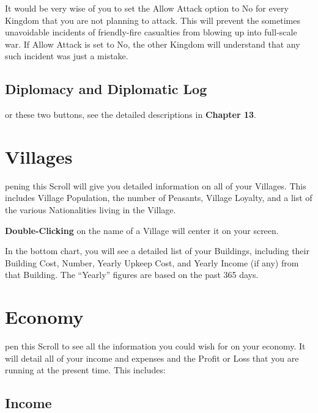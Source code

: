 
It would be very wise of you to set the Allow Attack option to No for every Kingdom that you are not planning to attack. This will prevent the sometimes unavoidable incidents of friendly-fire casualties from blowing up into full-scale war. If Allow Attack is set to No, the other Kingdom will understand that any such incident was just a mistake.

\subsection{Diplomacy and Diplomatic Log}

or these two buttons, see the detailed descriptions in \textbf{Chapter 13}.

\section{Villages}


pening this Scroll will give you detailed information on all of your Villages. This includes Village Population, the number of Peasants, Village Loyalty, and a list of the various Nationalities living in the Village.

\textbf{Double-Clicking} on the name of a Village will center it on your screen.


In the bottom chart, you will see a detailed list of your Buildings, including their Building Cost, Number, Yearly Upkeep Cost, and Yearly Income (if any) from that Building. The “Yearly” figures are based on the past 365 days.

\section{Economy}


pen this Scroll to see all the information you could wish for on your economy. It will detail all of your income and expenses and the Profit or Loss that you are running at the present time. This includes:

\subsection{Income}

